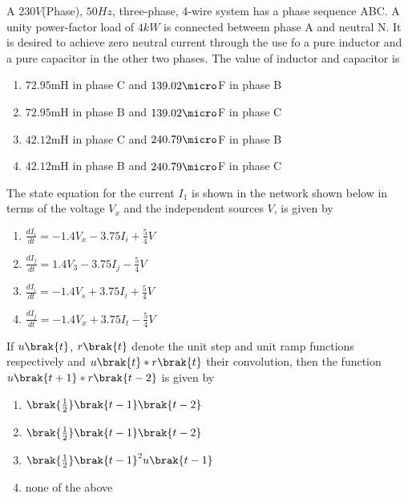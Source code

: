\item A $230V$(Phase), $50Hz$, three-phase, 4-wire system has a phase sequence ABC. A unity power-factor load of $4kW$ is connected betweem phase A and neutral N. It is desired to achieve zero neutral current through the use fo a pure inductor and a pure capacitor in the other two phases. The value of inductor and capacitor is 
\begin{enumerate}
    \item $72.95$mH in phase C and $139.02\micro$F in phase B
     \item $72.95$mH in phase B and $139.02\micro$F in phase C
      \item $42.12$mH in phase C and $240.79\micro$F in phase B
      \item $42.12$mH in phase B and $240.79\micro$F in phase C
\end{enumerate}
\item The state equation for the current $I_1$ is shown in the network 
shown below in terms of the voltage $V_x$ and the independent sources $V$, is given by 
\begin{figure}[!ht]
\centering
{}%
\end{figure}
\begin{enumerate}
  \item $\frac{dI_i}{dt}=-1.4V_x - 3.75I_i + \frac{5}{4}V$
    \item $\frac{dI_j}{dt}=1.4V_3 - 3.75I_j - \frac{5}{4}V$
    \item $\frac{dI_i}{dt}=-1.4V_s + 3.75I_i + \frac{5}{4}V$
    \item $\frac{dI_j}{dt}=-1.4V_x + 3.75I_t - \frac{5}{4}V$
\end{enumerate}
\item If $u\brak{t}$, $r\brak{t}$ denote the unit step and unit ramp functions respectively and $u\brak{t}*r\brak{t}$ their convolution, then the function $u\brak{t+1}*r\brak{t-2}$ is given by 
\begin{multicols}{2}
\begin{enumerate}
  \item $\brak{\frac{1}{2}}\brak{t-1}\brak{t-2}$
    \item $\brak{\frac{1}{2}}\brak{t-1}\brak{t-2}$
    \item $\brak{\frac{1}{2}}\brak{t-1}^2 u\brak{t-1}$
    \item none of the above
\end{enumerate}    
\end{multicols}

